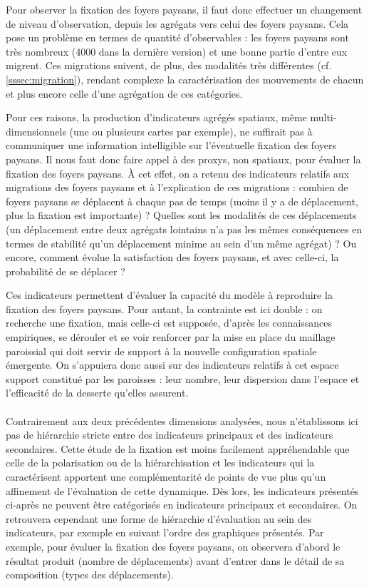 Pour observer la fixation des foyers paysans, il faut donc effectuer un changement de niveau d'observation, depuis les agrégats vers celui des foyers paysans.
Cela pose un problème en termes de quantité d'observables :
les foyers paysans sont très nombreux (4000 dans la dernière version) et une bonne partie d'entre eux migrent.
Ces migrations suivent, de plus, des modalités très différentes (cf. \cref{sssec:migration}), rendant complexe la caractérisation des mouvements de chacun et plus encore celle d'une agrégation de ces catégories.

Pour ces raisons, la production d'indicateurs agrégés spatiaux, même multi-dimensionnels (une ou plusieurs cartes par exemple), ne suffirait pas à communiquer une information intelligible sur l'éventuelle fixation des foyers paysans.
Il nous faut donc faire appel à des \og proxys\fg{}, non spatiaux, pour évaluer la fixation des foyers paysans.
À cet effet, on a retenu des indicateurs relatifs aux migrations des foyers paysans et à l'explication de ces migrations :
combien de foyers paysans se déplacent à chaque pas de temps (moins il y a de déplacement, plus la fixation est importante) ?
Quelles sont les modalités de ces déplacements (un déplacement entre deux agrégats lointains n'a pas les mêmes conséquences en termes de stabilité qu'un déplacement minime au sein d'un même agrégat) ?
Ou encore, comment évolue la satisfaction des foyers paysans, et avec celle-ci, la probabilité de se déplacer ?

Ces indicateurs permettent d'évaluer la capacité du modèle à reproduire la fixation des foyers paysans.
Pour autant, la contrainte est ici double :
on recherche une fixation, mais celle-ci est supposée, d'après les connaissances empiriques, se dérouler et se voir renforcer par la mise en place du maillage paroissial qui doit servir de support à la nouvelle configuration spatiale émergente.
On s'appuiera donc aussi sur des indicateurs relatifs à cet espace support constitué par les paroisses :
leur nombre, leur dispersion dans l'espace et l'efficacité de la desserte qu'elles assurent.

\paragraph*{}
Contrairement aux deux précédentes dimensions analysées, nous n'établissons ici pas de hiérarchie stricte entre des indicateurs principaux et des indicateurs secondaires.
Cette étude de la fixation est moins facilement appréhendable que celle de la polarisation ou de la hiérarchisation et les indicateurs qui la caractérisent apportent une complémentarité de points de vue plus qu'un affinement de l'évaluation de cette dynamique.
Dès lors, les indicateurs présentés ci-après ne peuvent être catégorisés en indicateurs principaux et secondaires.
On retrouvera cependant une forme de hiérarchie d'évaluation au sein des indicateurs, par exemple en suivant l'ordre des graphiques présentés.
Par exemple, pour évaluer la fixation des foyers paysans, on observera d'abord le résultat produit (nombre de déplacements) avant d'entrer dans le détail de sa composition (types des déplacements).


